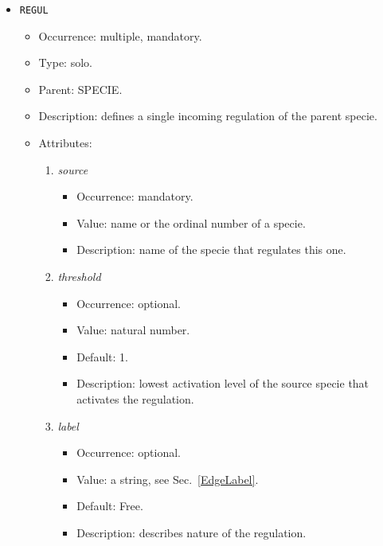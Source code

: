 \documentclass[12pt]{article}
\newenvironment{menum}{
\begin{enumerate}
  \setlength{\itemsep}{0pt}
  \setlength{\parskip}{0pt}
  \setlength{\parsep}{0pt}
}{\end{enumerate}}
\newenvironment{mitem}{
\begin{itemize}
  \setlength{\itemsep}{0pt}
  \setlength{\parskip}{0pt}
  \setlength{\parsep}{0pt}
}{\end{itemize}}
\begin{document}
\begin{mitem}
	\item \texttt{REGUL}
	\begin{mitem}
		\item Occurrence: multiple, mandatory.
		\item Type: solo.
		\item Parent: SPECIE.
		\item Description: defines a single incoming regulation of the parent specie.
		\item Attributes:	
		\begin{menum}
			\item \textit{source} 
			\begin{mitem}
				\item Occurrence: mandatory.
				\item Value: name or the ordinal number of a specie.
				\item Description: name of the specie that regulates this one.
			\end{mitem}
			\item \textit{threshold} 
			\begin{mitem}
				\item Occurrence: optional.
				\item Value: natural number.
				\item Default: 1.
				\item Description: lowest activation level of the source specie that activates the regulation.
			\end{mitem}
			\item \textit{label} 
			\begin{mitem}
				\item Occurrence: optional.
				\item Value: a string, see Sec.~\ref{EdgeLabel}.
				\item Default: Free.
				\item Description: describes nature of the regulation.
			\end{mitem}
		\end{menum}
	\end{mitem}
\end{mitem}
		
\end{document}
